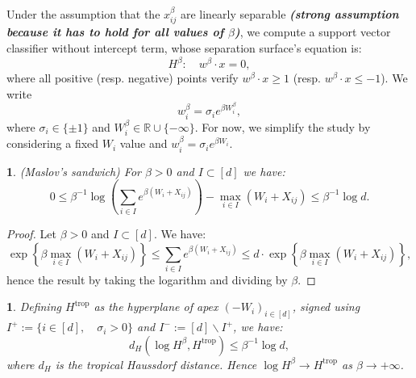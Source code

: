 \documentclass[oneside,english,a4paper]{amsart}
\numberwithin{equation}{section}
\numberwithin{figure}{section}
\theoremstyle{plain}
\theoremstyle{definition}
\theoremstyle{plain}
\newtheorem{prop}[thm]{\protect\propositionname}
\theoremstyle{remark}
\theoremstyle{plain}
\newtheorem{lem}[thm]{\protect\lemmaname}
\theoremstyle{definition}
\theoremstyle{definition}
\providecommand{\lemmaname}{Lemma}
\providecommand{\propositionname}{Proposition}
\begin{document}
Under the assumption that the $x_{ij}^{\beta}$ are linearly separable
\textbf{\emph{(strong assumption because it has to hold for all values
of $\beta$)}}, we compute a support vector classifier without intercept
term, whose separation surface's equation is: 
\[
H^{\beta}:\quad w^{\beta}\cdot x=0,
\]
where all positive (resp. negative) points verify $w^{\beta}\cdot x\ge1$
(resp. $w^{\beta}\cdot x\le-1$). We write 
\[
w_{i}^{\beta}=\sigma_{i}e^{\beta W_{i}^{\beta}},
\]
where $\sigma_{i}\in\{\pm1\}$ and $W_{i}^{\beta}\in\mathbb{R}\cup\{-\infty\}$.
For now, we simplify the study by considering a fixed $W_{i}$ value
and $w_{i}^{\beta}=\sigma_{i}e^{\beta W_{i}}$. 
\begin{lem}
(Maslov's sandwich) For $\beta>0$ and $I\subset[d]$ we have: 
\[
0\leq\beta^{-1}\log\left(\sum_{i\in I}e^{\beta(W_{i}+X_{ij})}\right)-\max_{i\in I}(W_{i}+X_{ij})\le\beta^{-1}\log d.
\]
\end{lem}

\begin{proof}
Let $\beta>0$ and $I\subset[d]$. We have: 
\[
\exp\left\{ \beta\max_{i\in I}\left(W_{i}+X_{ij}\right)\right\} \le\sum_{i\in I}e^{\beta(W_{i}+X_{ij})}\le d\cdot\exp\left\{ \beta\max_{i\in I}\left(W_{i}+X_{ij}\right)\right\} ,
\]
hence the result by taking the logarithm and dividing by $\beta$. 
\end{proof}
\begin{prop} 

Defining $H^{\text{trop}}$ as the hyperplane of apex $(-W_{i})_{i\in[d]}$,
signed using $I^{+}:=\{i\in[d],\quad\sigma_{i}>0\}$ and $I^{-}:=[d]\backslash I^{+}$,
we have: 
\[
d_{H}\left(\log H^{\beta},H^{\text{trop}}\right)\le\beta^{-1}\log d,
\]
where $d_{H}$ is the tropical Haussdorf distance. Hence $\log H^{\beta}\longrightarrow H^{\text{trop}}$
as $\beta\longrightarrow+\infty$. 
\end{prop}
\end{document}
